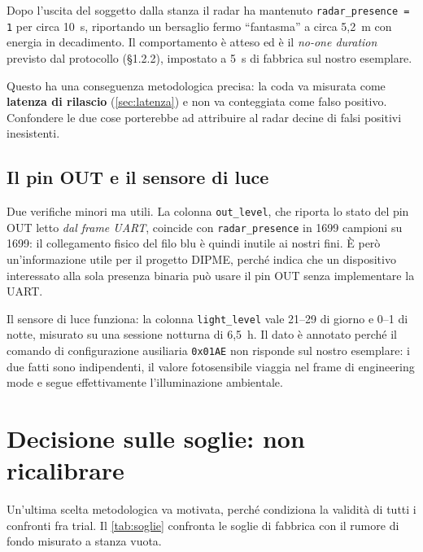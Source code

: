 Dopo l'uscita del soggetto dalla stanza il radar ha mantenuto
\texttt{radar\_presence = 1} per circa 10~s, riportando un bersaglio fermo
``fantasma'' a circa 5,2~m con energia in decadimento. Il comportamento è atteso ed
è il \emph{no-one duration} previsto dal protocollo (\S1.2.2), impostato a 5~s di
fabbrica sul nostro esemplare.

Questo ha una conseguenza metodologica precisa: la coda va misurata come
\textbf{latenza di rilascio} (\cref{sec:latenza}) e non va conteggiata come falso
positivo. Confondere le due cose porterebbe ad attribuire al radar decine di falsi
positivi inesistenti.

\subsection{Il pin OUT e il sensore di luce}

Due verifiche minori ma utili. La colonna \texttt{out\_level}, che riporta lo stato
del pin OUT letto \emph{dal frame UART}, coincide con \texttt{radar\_presence} in
1699 campioni su 1699: il collegamento fisico del filo blu è quindi inutile ai
nostri fini. È però un'informazione utile per il progetto DIPME, perché indica che
un dispositivo interessato alla sola presenza binaria può usare il pin OUT senza
implementare la UART.

Il sensore di luce funziona: la colonna \texttt{light\_level} vale 21--29 di giorno
e 0--1 di notte, misurato su una sessione notturna di 6,5~h. Il dato è annotato
perché il comando di configurazione ausiliaria \texttt{0x01AE} non risponde sul
nostro esemplare: i due fatti sono indipendenti, il valore fotosensibile viaggia
nel frame di engineering mode e segue effettivamente l'illuminazione ambientale.

\section{Decisione sulle soglie: non ricalibrare}
\label{sec:soglie}

Un'ultima scelta metodologica va motivata, perché condiziona la validità di tutti i
confronti fra trial. Il \cref{tab:soglie} confronta le soglie di fabbrica con il
rumore di fondo misurato a stanza vuota.


